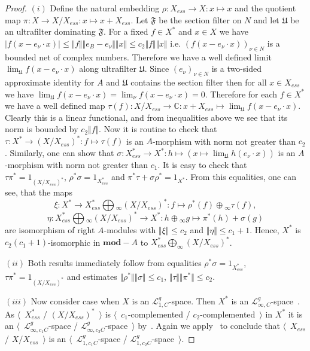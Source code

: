 \documentclass[12pt]{article}
\begin{document}
\begin{proof} $(i)$ Define the natural embedding $\rho:X_{ess}\to X:x\mapsto x$
and the quotient map  $\pi:X\to X/X_{ess}:x\mapsto x+X_{ess}$. Let
$\mathfrak{F}$ be the section filter on $N$ and let $\mathfrak{U}$ be an
ultrafilter dominating $\mathfrak{F}$. For a fixed $f\in X ^*$ and $x\in X $ we
have $|f(x-e_\nu\cdot x)|\leq\Vert f\Vert\Vert e_B - e_\nu\Vert\Vert x\Vert\leq
c_2\Vert f\Vert\Vert x\Vert$ i.e. ${(f(x-e_\nu\cdot x))}_{\nu\in N}$ is a
bounded net of complex numbers. Therefore we have a well defined limit
$\lim_{\mathfrak{U}}f(x-e_\nu\cdot x)$ along ultrafilter $\mathfrak{U}$. Since
${(e_\nu)}_{\nu\in N}$ is a two-sided approximate identity for $A$ and
$\mathfrak{U}$ contains the section filter then for all $x\in X_{ess}$ we have
$\lim_{\mathfrak{U}}f(x-e_\nu\cdot x)=\lim_{\nu}f(x-e_\nu\cdot x)=0$. Therefore
for each $f\in X ^*$ we have a well defined map $\tau(f):X /X_{ess}\to
\mathbb{C}:x+X_{ess}\mapsto \lim_{\mathfrak{U}} f(x-e_\nu\cdot x)$. Clearly this
is a linear functional, and from inequalities above we see that its norm is
bounded by $c_2\Vert f\Vert$. Now it is routine to check that $\tau:X^*\to {(X/
X_{ess})}^*:f\mapsto \tau(f)$ is an $A$-morphism with norm not greater than
$c_2$. Similarly, one can show that $\sigma:X_{ess}^*\to X^*:h\mapsto(x\mapsto
\lim_{\mathfrak{U}}h(e_\nu\cdot x))$ is an $A$-morphism with norm not greater
than $c_1$. It is easy to check that $\tau \pi^*=1_{{(X/X_{ess})}^*}$,
$\rho^*\sigma=1_{X_{ess}^*}$ and  $\pi^*\tau+\sigma\rho^*=1_{X^*}$. From this
equalities, one can see, that the maps
\[
\xi
:X^*\to X_{ess}^*\bigoplus{}_\infty {(X/X_{ess})}^*
:f\mapsto \rho^*(f)\oplus{}_\infty \tau(f),
\]
\[
\eta
:X_{ess}^*\bigoplus{}_\infty {(X/X_{ess})}^*\to X^*
:h\oplus{}_\infty g\mapsto \pi^*(h)+\sigma(g)
\]
are isomorphism of right $A$-modules with $\Vert\xi \Vert\leq c_2$ and $\Vert
\eta\Vert\leq c_1+1$. Hence, $X^*$ is $c_2(c_1+1)$-isomorphic in
$\mathbf{mod}-A$ to $X_{ess}^*\bigoplus_\infty {(X/X_{ess})}^*$.

$(ii)$ Both results immediately follow from equalities
$\rho^*\sigma=1_{X_{ess}^*}$, $\tau \pi^*=1_{{(X/X_{ess})}^*}$ and estimates
$\Vert \rho^*\Vert\Vert \sigma\Vert\leq c_1$, $\Vert\tau\Vert\Vert
\pi^*\Vert\leq c_2$.

$(iii)$ Now consider case when $X$ is an $\mathcal{L}_{1,C}^g$-space. Then $X^*$
is an $\mathcal{L}_{\infty,C}^g$-space~\cite[corollary
23.2.1(1)]{DefFloTensNorOpId}. As $\langle$~$X_{ess}^*$ /
${(X/X_{ess})}^*$~$\rangle$ is $\langle$~$c_1$-complemented /
$c_2$-complemented~$\rangle$ in $X^*$ it is an
$\langle$~$\mathcal{L}_{\infty,c_1C}^g$-space /
$\mathcal{L}_{\infty,c_2C}^g$-space~$\rangle$ by~\cite[corollary
23.2.1(1)]{DefFloTensNorOpId}. Again we apply~\cite[corollary
23.2.1(1)]{DefFloTensNorOpId} to conclude that $\langle$~$X_{ess}$  /
$X/X_{ess}$~$\rangle$ is an $\langle$~$\mathcal{L}_{1,c_1C}^g$-space /
$\mathcal{L}_{1,c_2C}^g$-space~$\rangle$.
\end{proof}
\end{document}
